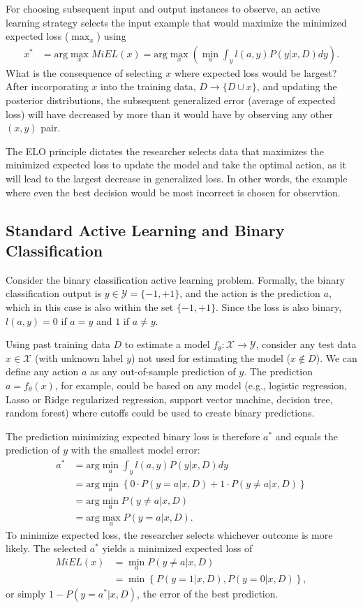 \documentclass[a4paper,11pt]{article}
\begin{document}
For choosing subsequent input and output instances to observe, an active learning strategy selects the input example that would maximize the minimized expected loss ($\max_x$) using 
\begin{align}
x^{*}  &= \text{arg}\max_x MiEL(x) = \text{arg}\max_{x} \left( \min_{a} \int_y l(a,y) P(y|x,D) dy \right).
\end{align}
What is the consequence of selecting $x$ where expected loss would be largest? After incorporating $x$ into the training data, $D \to \{D \cup x \}$, and updating the posterior distributions, the subsequent generalized error (average of expected loss) will have decreased by more than it would have by observing any other $(x,y)$ pair.

The ELO principle dictates the researcher selects data that maximizes the minimized expected loss  to update the model and take the optimal action, as it will lead to the largest decrease in generalized loss. In other words, the example where even the best decision would be most incorrect is chosen for observtion. 

\subsection{Standard Active Learning and Binary Classification}

Consider the binary classification active learning problem. Formally, the binary classification output is $y \in \mathcal{Y} = \{-1,+1\}$, and the action is the prediction $a$, which in this case is also within the set $\{-1,+1\}$. Since the loss is also binary, $l(a,y)=0$ if $a=y$ and $1$ if $a \neq y$. 

Using past training data $D$ to estimate a model $f_\theta: \mathcal{X} \to \mathcal{Y}$, consider any test data $x \in \mathcal{X}$ (with unknown label $y$) not used for estimating the model ($x \notin D$). We can define any action $a$ as any out-of-sample prediction of $y$. The prediction $a=f_\theta(x)$, for example, could be based on any model (e.g., logistic regression, Lasso or Ridge regularized regression, support vector machine, decision tree, random forest) where cutoffs could be used to create binary predictions. 

The prediction minimizing expected binary loss is therefore $a^{*}$ and equals the prediction of $y$ with the smallest model error:
\begin{align}
a^{*} &= \text{arg} \min_{a} \int_y l(a,y) P(y|x,D) dy  \\
& = \text{arg} \min_{a} \left\{ 0 \cdot P(y=a|x,D) + 1 \cdot P(y \neq a|x,D) \right\}  \\
&= \text{arg} \min_{a} P(y \neq a|x,D) \\
&= \text{arg} \max_{a} P(y = a|x,D) .
\end{align}
To minimize expected loss, the researcher selects whichever outcome is more likely. The selected $a^{*}$ yields a minimized expected loss of
\begin{align}
 MiEL(x) &= \min_{a} P(y \neq a|x,D) \\
 &= \min \left\{ P(y=1|x,D), P(y=0|x,D) \right\},
\end{align}
or simply $1 - P(y = a^{*}|x,D)$, the error of the best prediction. 
\end{document}
